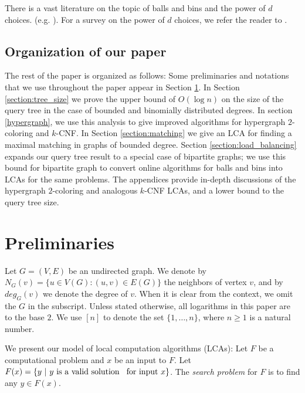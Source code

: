\documentclass[english, oribibl]{llncs}
\begin{document}
There is a vast literature on the topic of balls and bins and the power of $d$ choices. (e.g. \cite{ABK+99, BCS+06, DR96, TW07}). For a survey on the power of $d$ choices, we refer the reader to \cite{MRR01}.





\subsection{Organization of our paper}

The rest of the paper is organized as follows:
Some preliminaries and notations that we use throughout the paper appear in Section \ref{section:preliminaries}.
In Section \ref{section:tree_size} we prove the upper bound of $O(\log{n})$ on 
the size of the query tree in the case of bounded and binomially distributed degrees.
In section \ref{hypergraph}, we use this analysis to give improved algorithms for hypergraph $2$-coloring and $k$-CNF.
In Section \ref{section:matching} we give an LCA for finding a maximal matching in graphs of bounded degree. 
Section \ref{section:load_balancing} expands our query tree result to a special case of bipartite graphs;
we use this bound for bipartite graph to convert online algorithms for balls and bins into LCAs for the same problems.
The appendices provide in-depth discussions of the hypergraph $2$-coloring and analogous $k$-CNF LCAs, and a lower bound to the query tree size.




\section{Preliminaries}\label{section:preliminaries}



Let $G=(V, E)$ be an undirected graph.
We denote by $N_{G}(v)=\{u\in V(G): (u,v)\in E(G)\}$ 
the neighbors of vertex $v$, and by $deg_{G}(v)$ we denote the degree of $v$.
When it is clear from the context, we omit the $G$ in the subscript.
Unless stated otherwise, all logarithms in this paper are to the base $2$.
We use $[n]$ to denote the set $\{1,\ldots, n\}$, where $n\geq 1$ is a natural number. 


We present our model of local computation algorithms (LCAs):
Let $F$ be a computational problem and $x$ be an input to $F$.
Let $F(x) = \{y~|~ y {\rm ~is~ a~} {\rm valid~solution~}$ ${\rm for~input~} x\}$.
The {\em search problem} for $F$ is to find any $y \in F(x)$.
\end{document}
